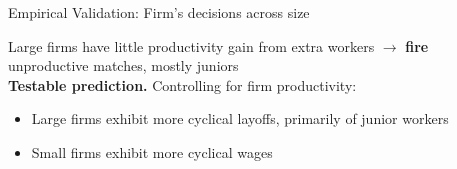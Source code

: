 \documentclass[9pt,aspectratio=169]{beamer} %
\begin{document}
\begin{frame}{Empirical Validation: Firm's decisions across size}

Large firms have little productivity gain from extra workers $\rightarrow$ \textbf{fire} unproductive matches, mostly juniors \\
\textbf{Testable prediction.} Controlling for firm productivity:
\begin{itemize}
    \item Large firms exhibit more cyclical layoffs, primarily of junior workers
    \item Small firms exhibit more cyclical wages
\end{itemize}
\end{frame}
\end{document}
